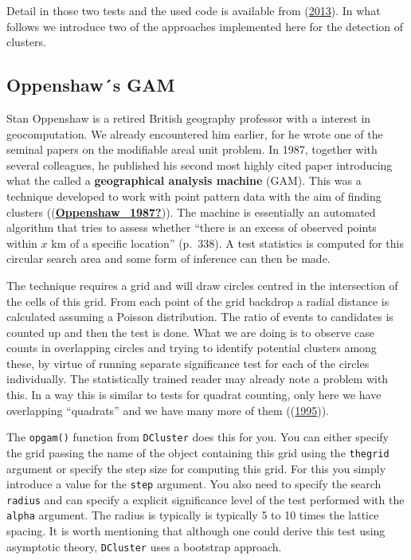 \documentclass[
  krantz2]{krantz}
\begin{document}
Detail in those two tests and the used code is available from (\protect\hyperlink{ref-Bivand_2013}{2013}). In what follows we introduce two of the approaches implemented here for the detection of clusters.

\hypertarget{oppenshaws-gam}{%
\subsection{Oppenshaw´s GAM}\label{oppenshaws-gam}}

Stan Oppenshaw is a retired British geography professor with a interest in geocomputation. We already encountered him earlier, for he wrote one of the seminal papers on the modifiable areal unit problem. In 1987, together with several colleagues, he published his second most highly cited paper introducing what the called a \textbf{geographical analysis machine} (GAM). This was a technique developed to work with point pattern data with the aim of finding clusters ((\protect\hyperlink{ref-Oppenshaw_1987}{\textbf{Oppenshaw\_1987?}})). The machine is essentially an automated algorithm that tries to assess whether ``there is an excess of observed points within \(x\) km of a specific location'' (p.~338). A test statistics is computed for this circular search area and some form of inference can then be made.

The technique requires a grid and will draw circles centred in the intersection of the cells of this grid. From each point of the grid backdrop a radial distance is calculated assuming a Poisson distribution. The ratio of events to candidates is counted up and then the test is done. What we are doing is to observe case counts in overlapping circles and trying to identify potential clusters among these, by virtue of running separate significance test for each of the circles individually. The statistically trained reader may already note a problem with this. In a way this is similar to tests for quadrat counting, only here we have overlapping ``quadrats'' and we have many more of them ((\protect\hyperlink{ref-Kulldorff_1995}{1995})).

The \texttt{opgam()} function from \texttt{DCluster} does this for you. You can either specify the grid passing the name of the object containing this grid using the \texttt{thegrid} argument or specify the step size for computing this grid. For this you simply introduce a value for the \texttt{step} argument. You also need to specify the search \texttt{radius} and can specify a explicit significance level of the test performed with the \texttt{alpha} argument. The radius is typically is typically 5 to 10 times the lattice spacing. It is worth mentioning that although one could derive this test using asymptotic theory, \texttt{DCluster} uses a bootstrap approach.
\end{document}

